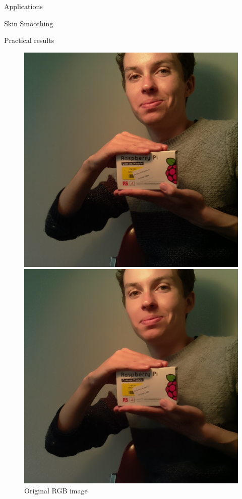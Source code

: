 \documentclass[10pt]{article}
\begin{document}
\begin{section}{Applications}
\begin{subsection}{Skin Smoothing}
\begin{subsubsection}{Practical results}
            \begin{figure}[!h]
                \centering
                \begin{minipage}[b]{0.48\textwidth}
                    \includegraphics[width=\textwidth]{fig/merging_input1.jpg}
                    \caption{Original RGB image}
                    \label{fig:merging_practical1}
                \end{minipage} \hspace{0.5em} %
                \begin{minipage}[b]{0.48\textwidth}
                    \includegraphics[width=\textwidth]{fig/merging_output1.jpg}

\end{minipage}
\end{figure}
\end{subsubsection}
\end{subsection}
\end{section}
\end{document}
